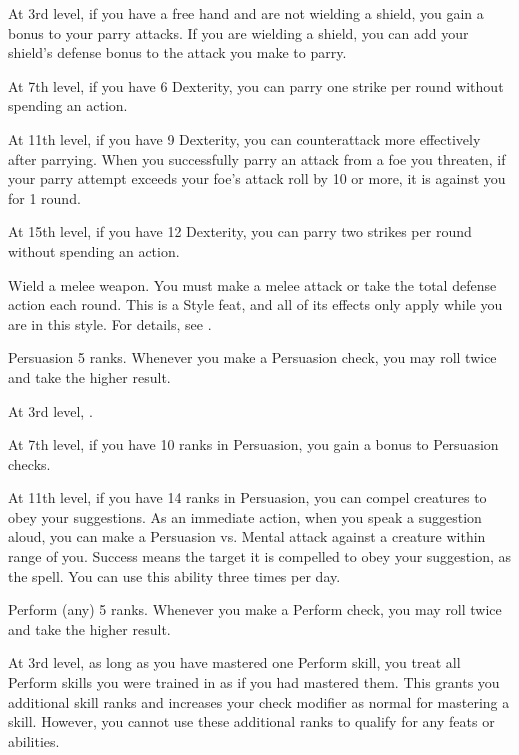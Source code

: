     At 3rd level, if you have a free hand and are not wielding a shield, you gain a  bonus to your parry attacks.
    If you are wielding a shield, you can add your shield's defense bonus to the attack you make to parry.

    At 7th level, if you have 6 Dexterity, you can parry one strike per round without spending an action.

    At 11th level, if you have 9 Dexterity, you can counterattack more effectively after parrying.
    When you successfully parry an attack from a foe you threaten, if your parry attempt exceeds your foe's attack roll by 10 or more, it is  against you for 1 round.

    At 15th level, if you have 12 Dexterity, you can parry two strikes per round without spending an action.

    \stylereq Wield a melee weapon.
    You must make a melee attack or take the total defense action each round.
     This is a Style feat, and all of its effects only apply while you are in this style.
    For details, see .

    \featpre Persuasion 5 ranks.
    \featben Whenever you make a Persuasion check, you may roll twice and take the higher result.

    At 3rd level, \tdash.

    At 7th level, if you have 10 ranks in Persuasion, you gain a  bonus to Persuasion checks.

    At 11th level, if you have 14 ranks in Persuasion, you can compel creatures to obey your suggestions.
    As an immediate action, when you speak a suggestion aloud, you can make a Persuasion vs. Mental attack against a creature within \rngmed range of you.
    Success means the target it is compelled to obey your suggestion, as the  spell.
    You can use this ability three times per day.

    \featpre Perform (any) 5 ranks.
    \featben Whenever you make a Perform check, you may roll twice and take the higher result.

    At 3rd level, as long as you have mastered one Perform skill, you treat all Perform skills you were trained in as if you had mastered them.
    This grants you additional skill ranks and increases your check modifier as normal for mastering a skill.
    However, you cannot use these additional ranks to qualify for any feats or abilities.


